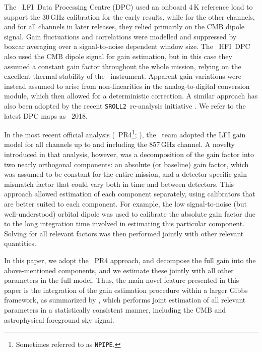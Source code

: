 \documentclass[twocolumn]{aa}
\newcommand{\lfi}[0]{LFI}
\newcommand{\hfi}[0]{HFI}
\newcommand{\npipe}[0]{\texttt{NPIPE}}
\newcommand{\srollTwo}[0]{\texttt{SROLL2}}
\begin{document}
The \Planck\ \lfi\ Data Processing Centre (DPC) \citep{planck2013-p02,planck2014-a06,planck2016-l02} used an onboard 4\,K reference load to support the 30\,GHz calibration for the early results, while for the other channels, and for all channels in later releases, they relied primarily on the CMB dipole signal. Gain fluctuations and correlations were modelled and suppressed by boxcar averaging over a signal-to-noise dependent window size. The \Planck\ \hfi\ DPC \citep{planck2013-p03f,planck2014-a09,planck2016-l03} also used the CMB dipole signal for gain estimation, but in this case they assumed a constant gain factor throughout the whole mission, relying on the excellent thermal stability of the \Planck\ instrument. Apparent gain variations were instead assumed to arise from non-linearities in the analog-to-digital conversion module, which then allowed for a deterministic correction. A similar approach has also been adopted by the recent \srollTwo\ re-analysis initiative \citep{delouis:2019}. We refer to the latest DPC maps as \Planck\ 2018.

In the most recent official analysis (\Planck\ PR4\footnote{Sometimes referred to as \npipe.}; \citealp{planck2020-LVII}), the \Planck\ team adopted the LFI gain model for all channels up to and including the 857\,GHz channel. A novelty introduced in that analysis, however, was a decomposition of the gain factor into two nearly orthogonal components: an absolute (or baseline) gain factor, which was assumed to be constant for the entire mission, and a detector-specific gain mismatch factor that could vary both in time and between detectors. This approach allowed estimation of each component separately, using calibrators that are better suited to each component. For example, the low signal-to-noise (but well-understood) orbital dipole was used to calibrate the absolute gain factor due to the long integration time involved in estimating this particular component. Solving for all relevant factors was then performed jointly with other relevant quantities.

In this paper, we adopt the \Planck\ PR4 approach, and decompose the full gain into the above-mentioned components, and we estimate these jointly with all other parameters in the full model. Thus, the main novel feature presented in this paper is the integration of the gain estimation procedure within a larger Gibbs framework, as summarized by \citet{bp01}, which performs joint estimation of all relevant parameters in a statistically consistent manner, including the CMB and astrophysical foreground sky signal.
\end{document}
